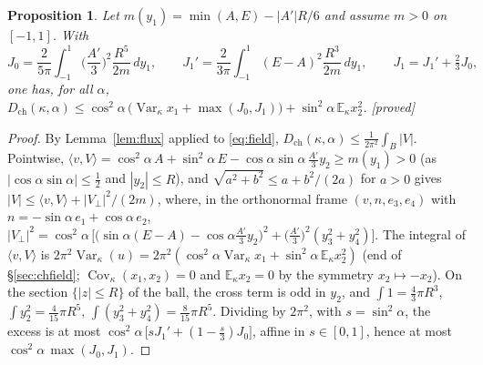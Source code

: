 \documentclass[11pt,a4paper]{article}
\newtheorem{proposition}[theorem]{Proposition}
\theoremstyle{remark}
\theoremstyle{definition}
\newcommand{\E}{\mathbb{E}}
\newcommand{\Cov}{\operatorname{Cov}}
\newcommand{\Var}{\operatorname{Var}}
\newcommand{\st}[1]{\textsf{[#1]}}
\newcommand{\Dch}{D_{\mathrm{ch}}}
\begin{document}
\begin{proposition}\label{prop:alpha}
Let $m(y_1)=\min(A,E)-|A'|R/6$ and assume $m>0$ on $[-1,1]$. With
\[
J_0=\frac{2}{5\pi}\int_{-1}^1\Big(\frac{A'}{3}\Big)^2\frac{R^5}{2m}\,dy_1,\qquad
J_1'=\frac{2}{3\pi}\int_{-1}^1(E-A)^2\frac{R^3}{2m}\,dy_1,\qquad J_1=J_1'+\tfrac23J_0,
\]
one has, for all $\alpha$,
$\Dch(\kappa,\alpha)\le\cos^2\alpha\,\big(\Var_\kappa x_1+\max(J_0,J_1)\big)+\sin^2\alpha\,\E_\kappa x_2^2$.
\st{proved}
\end{proposition}
\begin{proof}
By Lemma~\ref{lem:flux} applied to \eqref{eq:field}, $\Dch(\kappa,\alpha)\le\frac1{2\pi^2}\int_B|V|$.
Pointwise, $\langle v,V\rangle=\cos^2\!\alpha\,A+\sin^2\!\alpha\,E-\cos\alpha\sin\alpha\,\frac{A'}3y_2\ge m(y_1)>0$ (as
$|\cos\alpha\sin\alpha|\le\frac12$ and $|y_2|\le R$), and $\sqrt{a^2+b^2}\le a+b^2/(2a)$ for $a>0$ gives
$|V|\le\langle v,V\rangle+|V_\perp|^2/(2m)$, where, in the orthonormal frame $(v,n,e_3,e_4)$ with
$n=-\sin\alpha\,e_1+\cos\alpha\,e_2$,
$|V_\perp|^2=\cos^2\!\alpha\,\big[\big(\sin\alpha(E-A)-\cos\alpha\frac{A'}3y_2\big)^2+\big(\frac{A'}3\big)^2(y_3^2+y_4^2)\big]$.
The integral of $\langle v,V\rangle$ is $2\pi^2\Var_\kappa(u)=2\pi^2(\cos^2\!\alpha\Var_\kappa x_1+\sin^2\!\alpha\,\E_\kappa x_2^2)$
(end of \S\ref{sec:chfield}; $\Cov_\kappa(x_1,x_2)=0$ and $\E_\kappa x_2=0$ by the symmetry $x_2\mapsto-x_2$).
On the section $\{|z|\le R\}$ of the ball, the cross term is odd in $y_2$, and $\int1=\frac43\pi R^3$,
$\int y_2^2=\frac4{15}\pi R^5$, $\int(y_3^2+y_4^2)=\frac8{15}\pi R^5$. Dividing by $2\pi^2$, with $s=\sin^2\alpha$,
the excess is at most $\cos^2\!\alpha\,\big[sJ_1'+(1-\frac s3)J_0\big]$, affine in $s\in[0,1]$, hence at most
$\cos^2\!\alpha\,\max(J_0,J_1)$.
\end{proof}
\end{document}
